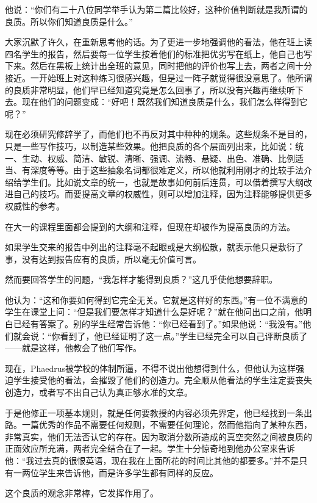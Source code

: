 \documentclass[UTF8]{article}
\begin{document}
\par 他说：“你们有二十八位同学举手认为第二篇比较好，这种价值判断就是我所谓的良质。所以你们知道良质是什么。”
\par 大家沉默了许久，在重新思考他的话。为了更进一步地强调他的看法，他在班上读四名学生的报告，然后要每一位学生按着他们的标准把优劣写在纸上，他自己也写下来。然后在黑板上统计出全班的意见，同时把他的评价也写上去，两者之间十分接近。一开始班上对这种练习很感兴趣，但是过一阵子就觉得很没意思了。他所谓的良质非常明显，他们早已经知道究竟是怎么回事了，所以没有兴趣再继续听下去。现在他们的问题变成：“好吧！既然我们知道良质是什么，我们怎么样得到它呢？”
\par 现在必须研究修辞学了，而他们也不再反对其中种种的规条。这些规条不是目的，只是一些写作技巧，以制造某些效果。他把良质的各个层面列出来，比如说：统一、生动、权威、简洁、敏锐、清晰、强调、流畅、悬疑、出色、准确、比例适当、有深度等等。由于这些抽象名词都很难定义，所以他就利用刚才的比较手法介绍给学生们。比如说文章的统一，也就是故事如何前后连贯，可以借着撰写大纲改进自己的技巧。而要提高文章的权威性，则可以增加注释，因为注释能够提供更多权威性的参考。
\par 在大一的课程里面都会提到的大纲和注释，但现在却被作为提高良质的方法。
\par 如果学生交来的报告中列出的注释毫不起眼或是大纲松散，就表示他只是敷衍了事，没有达到报告应有的良质，所以毫无价值可言。
\par 然而要回答学生的问题，“我怎样才能得到良质？”这几乎使他想要辞职。
\par 他认为：“这和你要如何得到它完全无关。它就是这样好的东西。”有一位不满意的学生在课堂上问：“但是我们要怎样才知道什么是好呢？”就在他问出口之前，他明白已经有答案了。别的学生经常告诉他：“你已经看到了。”如果他说：“我没有。”他们就会说：“你看到了，他已经证明了这一点。”学生已经完全可以自己评断良质了——就是这样，他教会了他们写作。
\par 现在，Phaedrus被学校的体制所逼，不得不说出他想得到什么，但他认为这样强迫学生接受他的看法，会摧毁了他们的创造力。完全顺从他看法的学生注定要丧失创造力，或者写不出自己认为真正够水准的文章。
\par 于是他修正一项基本规则，就是任何要教授的内容必须先界定，他已经找到一条出路。一篇优秀的作品不需要任何规则，不需要任何理论，然而他指向了某种东西，非常真实，他们无法否认它的存在。因为取消分数所造成的真空突然之间被良质的正面效应所充满，两者完全结合在了一起。学生十分惊奇地到他办公室来告诉他：“我过去真的很恨英语，现在我在上面所花的时间比其他的都要多。”并不是只有一两位学生来告诉他，而是许多学生都有同样的反应。
\par 这个良质的观念非常棒，它发挥作用了。
\end{document}
